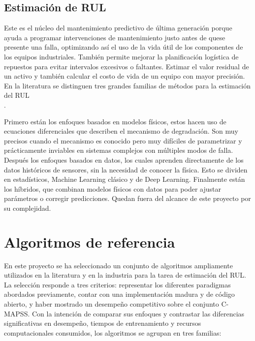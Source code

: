 \subsection{Estimación de RUL}

Este es el núcleo del mantenimiento predictivo de última generación porque ayuda a programar intervenciones de mantenimiento justo antes de quese presente una falla, optimizando así el uso de la vida útil de los componentes de los equipos industriales. También permite mejorar la planificación logística de repuestos para evitar intervalos excesivos o faltantes. Estimar el valor residual de un activo y también calcular el costo de vida de un equipo con mayor precisión. En la literatura se distinguen tres grandes familias de métodos para la estimación del RUL \cite{si2011}\\[.15cm].

Primero están los enfoques basados en modelos físicos, estos hacen uso de ecuaciones diferenciales que describen el mecanismo de degradación. Son muy precisos cuando el mecanismo es conocido pero muy difíciles de parametrizar y prácticamente inviables en sistemas complejos con múltiples modos de falla.
Después los enfoques basados en datos, los cuales aprenden directamente de los datos históricos de sensores, sin la necesidad de conocer la física. Esto se dividen en estadísticos, Machine Learning clásico y de Deep Learning. Finalmente están los híbridos, que combinan modelos físicos con datos para poder ajustar parámetros o corregir predicciones. Quedan fuera del alcance de este proyecto por su complejidad.\\[.15cm]

\section{Algoritmos de referencia}

En este proyecto se ha seleccionado un conjunto de algoritmos ampliamente utilizados en la literatura y en la industria para la tarea de estimación del RUL. La selección responde a tres criterios: representar los diferentes paradigmas abordados previamente, contar con una implementación madura y de código abierto, y haber mostrado un desempeño competitivo sobre el conjunto C-MAPSS. Con la intención de comparar sus enfoques y contrastar las diferencias significativas en desempeño, tiempos de entrenamiento y recursos computacionales consumidos, los algoritmos se agrupan en tres familias:

